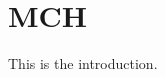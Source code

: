 \documentclass{standalone}
\begin{document}
\chapter{MCH}

This is the introduction. \cite{Weber2011,Sarathy2013}
\end{document}

